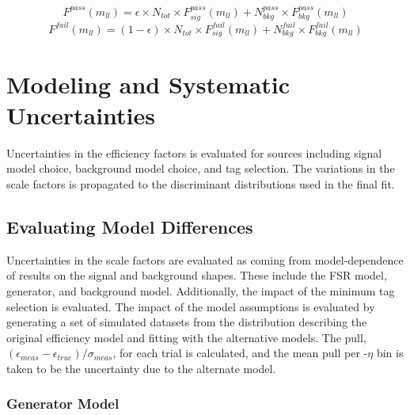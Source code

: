 \begin{equation}
F^{pass}\left(m_{ll}\right)=\epsilon \times N_{tot} \times F_{sig}^{pass}\left(m_{ll} \right) + N^{pass}_{bkg} \times F_{bkg}^{pass} \left(m_{ll} \right)
\label{eq:eff:pass:full}
\end{equation}
\begin{equation}
F^{fail}\left(m_{ll}\right)=\left(1-\epsilon\right) \times N_{tot} \times F_{sig}^{fail}\left(m_{ll} \right) + N^{fail}_{bkg} \times F_{bkg}^{fail} \left(m_{ll} \right)
\label{eq:eff:fail:full}
\end{equation}





\section{Modeling and Systematic Uncertainties}\label{ch:eff:systematics}
Uncertainties in the efficiency factors is evaluated for sources including signal model choice, background model choice, and tag selection. The variations in the scale factors is propagated to the discriminant distributions used in the final fit.
\subsection{Evaluating Model Differences}
Uncertainties in the scale factors are evaluated as coming from model-dependence of results on the signal and background shapes. These include the FSR model, generator, and background model. Additionally, the impact of the minimum tag selection \pt is evaluated. 
The impact of the model assumptions is evaluated by generating a set of simulated datasets from the \mll distribution describing the original efficiency model and fitting with the alternative models. The pull, $ (\epsilon_{meas}-\epsilon_{true})/{\sigma_{meas}} $, for each trial is calculated, and the mean pull per \pt-$\eta$ bin is taken to be the uncertainty due to the alternate model. 

\subsubsection{Generator Model}

